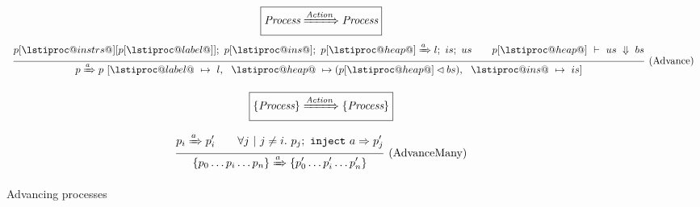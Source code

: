 \begin{figure}
$$
  \boxed{\textit{Process} \xRightarrow{\textit{Action}} \textit{Process}}
$$
$$
\ruleIN{
  \ProcBlockShake
    {p[\lstiproc@instrs@][p[\lstiproc@label@]]} 
    {p[\lstiproc@ins@]}
    {p[\lstiproc@heap@]}
    {a}
    {l}
    {is}
    {us}
  \qquad
    \ExpEval{p[\lstiproc@heap@]}{us}{bs}
}{
  \ProcShake
        {p}
        {a}
        {p~[    \lstiproc@label@~ \mapsto ~l
           , ~~ \lstiproc@heap@~  \mapsto (p[\lstiproc@heap@] \lhd bs)
           , ~~ \lstiproc@ins@~   \mapsto ~is]}
}{Advance}
$$

\vspace{2em}

$$
  \boxed{\{ \textit{Process} \} \xRightarrow{\textit{Action}} \{ \textit{Process} \}}
$$

$$
\ruleIN{
  \ProcShake{p_i}{a}{p'_i}
  \qquad
  \forall j~|~j \neq i.~
  \ProcInject{p_j}{a}{p'_j}
}{
  \ProcsShake{
    \sgl{p_0 \ldots p_i \ldots p_n}
  }{a}{
    \sgl{p'_0 \ldots p'_i \ldots p'_n}
  }
}{AdvanceMany}
$$



\caption{Advancing processes}

\label{fig:Process:Eval:Shake}
\end{figure}

